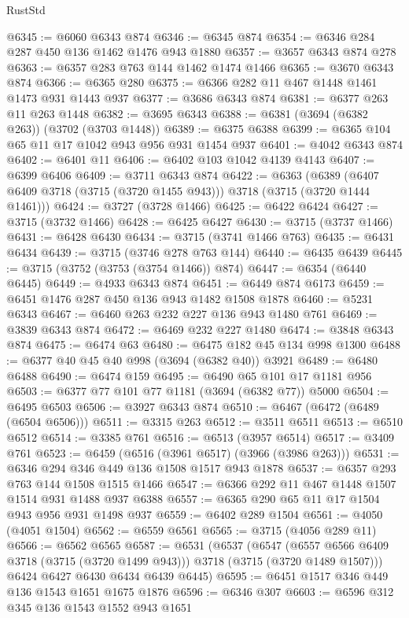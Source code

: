 \begin{lexlean}{RustStd}
\begin{coremodule}
@6345 := @6060 @6343 @874
@6346 := @6345 @874
@6354 := @6346 @284 @287 @450 @136 @1462 @1476 @943 @1880
@6357 := @3657 @6343 @874 @278
@6363 := @6357 @283 @763 @144 @1462 @1474 @1466
@6365 := @3670 @6343 @874
@6366 := @6365 @280
@6375 := @6366 @282 @11 @467 @1448 @1461 @1473 @931 @1443 @937
@6377 := @3686 @6343 @874
@6381 := @6377 @263 @11 @263 @1448
@6382 := @3695 @6343
@6388 := @6381 (@3694 (@6382 @263)) (@3702 (@3703 @1448))
@6389 := @6375 @6388
@6399 := @6365 @104 @65 @11 @17 @1042 @943 @956 @931 @1454 @937
@6401 := @4042 @6343 @874
@6402 := @6401 @11
@6406 := @6402 @103 @1042 @4139 @4143
@6407 := @6399 @6406
@6409 := @3711 @6343 @874
@6422 := @6363
    (@6389 (@6407 @6409 @3718 (@3715 (@3720 @1455 @943))) @3718 (@3715 (@3720 @1444 @1461)))
@6424 := @3727 (@3728 @1466)
@6425 := @6422 @6424
@6427 := @3715 (@3732 @1466)
@6428 := @6425 @6427
@6430 := @3715 (@3737 @1466)
@6431 := @6428 @6430
@6434 := @3715 (@3741 @1466 @763)
@6435 := @6431 @6434
@6439 := @3715 (@3746 @278 @763 @144)
@6440 := @6435 @6439
@6445 := @3715 (@3752 (@3753 (@3754 @1466)) @874)
@6447 := @6354 (@6440 @6445)
@6449 := @4933 @6343 @874
@6451 := @6449 @874 @6173
@6459 := @6451 @1476 @287 @450 @136 @943 @1482 @1508 @1878
@6460 := @5231 @6343
@6467 := @6460 @263 @232 @227 @136 @943 @1480 @761
@6469 := @3839 @6343 @874
@6472 := @6469 @232 @227 @1480
@6474 := @3848 @6343 @874
@6475 := @6474 @63
@6480 := @6475 @182 @45 @134 @998 @1300
@6488 := @6377 @40 @45 @40 @998 (@3694 (@6382 @40)) @3921
@6489 := @6480 @6488
@6490 := @6474 @159
@6495 := @6490 @65 @101 @17 @1181 @956
@6503 := @6377 @77 @101 @77 @1181 (@3694 (@6382 @77)) @5000
@6504 := @6495 @6503
@6506 := @3927 @6343 @874
@6510 := @6467 (@6472 (@6489 (@6504 @6506)))
@6511 := @3315 @263
@6512 := @3511 @6511
@6513 := @6510 @6512
@6514 := @3385 @761
@6516 := @6513 (@3957 @6514)
@6517 := @3409 @761
@6523 := @6459 (@6516 (@3961 @6517) (@3966 (@3986 @263)))
@6531 := @6346 @294 @346 @449 @136 @1508 @1517 @943 @1878
@6537 := @6357 @293 @763 @144 @1508 @1515 @1466
@6547 := @6366 @292 @11 @467 @1448 @1507 @1514 @931 @1488 @937 @6388
@6557 := @6365 @290 @65 @11 @17 @1504 @943 @956 @931 @1498 @937
@6559 := @6402 @289 @1504
@6561 := @4050 (@4051 @1504)
@6562 := @6559 @6561
@6565 := @3715 (@4056 @289 @11)
@6566 := @6562 @6565
@6587 := @6531
    (@6537
      (@6547 (@6557 @6566 @6409 @3718 (@3715 (@3720 @1499 @943))) @3718 (@3715 (@3720 @1489 @1507)))
      @6424
      @6427
      @6430
      @6434
      @6439
      @6445)
@6595 := @6451 @1517 @346 @449 @136 @1543 @1651 @1675 @1876
@6596 := @6346 @307
@6603 := @6596 @312 @345 @136 @1543 @1552 @943 @1651

\end{coremodule}
\end{lexlean}
